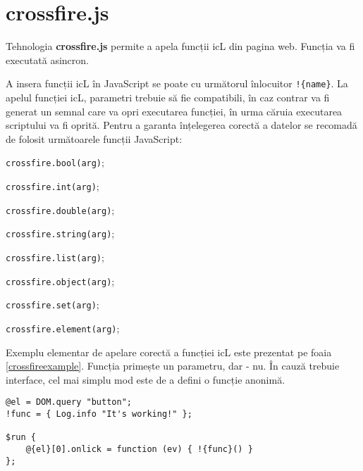 \section{crossfire.js}

Tehnologia {\bf crossfire.js} permite a apela funcții icL din pagina web. Funcția va fi executată asincron.

A insera funcții icL în JavaScript se poate cu următorul înlocuitor \lstinline|!{name}|. La apelul funcției icL, parametri trebuie să fie compatibili, în caz contrar va fi generat un semnal care va opri executarea funcției, în urma căruia executarea scriptului va fi oprită. Pentru a garanta înțelegerea corectă a datelor se recomadă de folosit următoarele funcții JavaScript:
\begin{icItems}
	\item \lstinline|crossfire.bool(arg)|;
	\item \lstinline|crossfire.int(arg)|;
	\item \lstinline|crossfire.double(arg)|;
	\item \lstinline|crossfire.string(arg)|;
	\item \lstinline|crossfire.list(arg)|;
	\item \lstinline|crossfire.object(arg)|;
	\item \lstinline|crossfire.set(arg)|;
	\item \lstinline|crossfire.element(arg)|;
\end{icItems}

Exemplu elementar de apelare corectă a funcției icL este prezentat pe foaia \ref{crossfireexample}. Funcția  primește un parametru, dar  - nu. În cauză trebuie interface, cel mai simplu mod este de a defini o funcție anonimă.

\begin{lstlisting}[caption=Exemplu de apelare a funcției icL, label=crossfireexample]
@el = DOM.query "button";
!func = { Log.info "It's working!" };

$run {
	@{el}[0].onlick = function (ev) { !{func}() }
};
\end{lstlisting}

